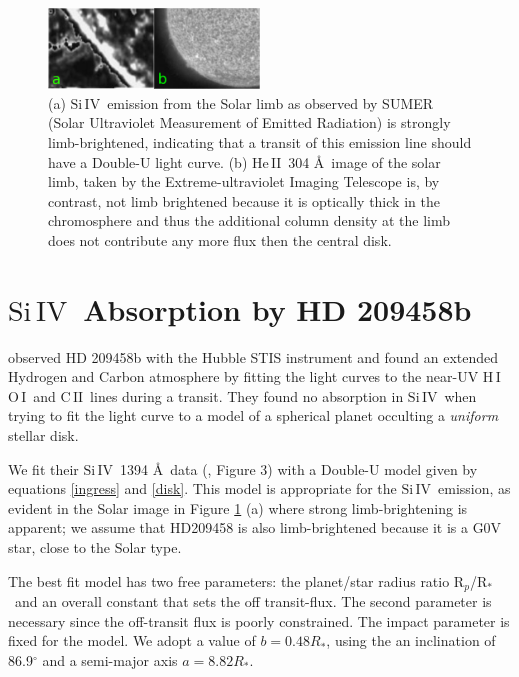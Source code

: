 \documentclass[manuscript]{aastex}
\newcommand{\cii}{\ensuremath{\mathrm{C}\,\scriptstyle \mathrm{II}}}
\newcommand{\oi}{\ensuremath{\mathrm{O}\,\scriptstyle \mathrm{I}}}
\newcommand{\hi}{\ensuremath{\mathrm{H}\,\scriptstyle \mathrm{I}}}
\newcommand{\heII}{\ensuremath{\mathrm{He}\,\scriptstyle \mathrm{II}}}
\newcommand{\siIV}{\ensuremath{\mathrm{Si}\,\scriptstyle \mathrm{IV}}}
\newcommand{\p}{R$_p$/R$_*$}
\begin{document}
\begin{figure}
\begin{center}
\includegraphics[width=0.5\textwidth]{limb_compare_siIV_heII.eps}
\caption{(a) \siIV\ emission from the Solar limb as observed by SUMER (Solar Ultraviolet Measurement of Emitted Radiation) \citep{wiik} is strongly limb-brightened, indicating that a transit of this emission line should have a Double-U light curve. (b) \heII\ 304 \AA\ image of the solar limb, taken by the Extreme-ultraviolet Imaging Telescope \citep{feldman} is, by contrast, not limb brightened because it is optically thick in the chromosphere and thus the additional column density at the limb does not contribute any more flux then the central disk.}
\label{limbs}
\end{center}
\end{figure}

\section{\siIV\ Absorption by HD 209458b} \label{osiris}

\citet{viddisc} observed HD 209458b with the Hubble STIS instrument and found
an extended Hydrogen and Carbon atmosphere by fitting the light curves
to the near-UV \hi\, \oi\ and \cii\ lines during a transit. They found no absorption in \siIV\ when trying to fit the light curve to a model of a spherical planet occulting a {\it uniform} stellar disk.

We fit their \siIV\ 1394 \AA\ data (\citet{vidmad}, Figure 3) with a Double-U model given by equations \ref{ingress} and \ref{disk}. This model is appropriate for the \siIV\ emission, as evident in the Solar image in Figure \ref{limbs} (a) where strong limb-brightening is apparent; we assume that HD209458 is also limb-brightened because it is a G0V star, close to the Solar type.

The best fit model has two free parameters: the planet/star radius ratio \p\ and an overall constant that sets the off transit-flux. The second parameter is necessary since the off-transit flux is poorly constrained. The impact parameter 
 is fixed for the model. We adopt a value of $ b= 0.48 R_*$, using the an inclination of 86.9$^\circ$ \citep{knutsonprop} and a semi-major axis $a=8.82 R_*$.
\end{document}
